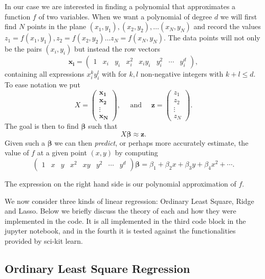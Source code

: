 \documentclass[parskip=half]{scrartcl}
\theoremstyle{definition}
\theoremstyle{remark}
\newcommand{\vect}[1]{{\bm{#1}}}
\begin{document}
In our case we are interested in finding a polynomial that approximates a function $f$ of two variables.
When we want a polynomial of degree $d$ we will first find $N$ points in the plane $(x_1, y_1), (x_2, y_2), \ldots (x_N, y_N)$ and record the values $z_1 = f(x_1, y_1), z_2 = f(x_2, y_2) \ldots z_N = f(x_N, y_N)$.
The data points will not only be the pairs $(x_i, y_i)$ but instead the row vectors 
\[
	\vect{x_i} = \begin{pmatrix} 1 & x_i & y_i & x_i^2 & x_i y_i & y_i^2 & \cdots & y_i^d \end{pmatrix},
\]
containing all expressions $x_i^k y_i^l$ with for $k,l$ non-negative integers with $k+l \leq d$. 
To ease notation we put 
\[
 X = \begin{pmatrix} \vect{x_1} \\ \vect{x_2} \\ \vdots \\ \vect{x_N} \end{pmatrix},
 \quad \text{ and } \quad
 \vect{z} = \begin{pmatrix} z_1 \\ z_2 \\ \vdots \\ z_N \end{pmatrix}. 	
\]
The goal is then to find $\vect{\beta}$ such that 
\begin{equation} \label{eq:linreg}
	X \vect{\beta} \approx \vect{z}.
\end{equation}
Given such a $\vect{\beta}$ we can then \emph{predict}, or perhaps more accurately estimate, the value of $f$ at a given point $(x,y)$ by computing 
\begin{equation} \label{eq:linregpredict}
	\begin{pmatrix} 1 & x & y & x^2 & xy & y^2 & \cdots & y^d \end{pmatrix} \vect{\beta} 
	=
	\beta_1  + \beta_2 x + \beta_3 y  + \beta_4 x^2 + \cdots.
\end{equation}
   
The expression on the right hand side is our polynomial approximation of $f$. 

We now consider three kinds of linear regression: Ordinary Least Square, Ridge and Lasso. 
Below we briefly discuss the theory of each and how they were implemented in the code.
It is all implemented in the third code block in the jupyter notebook, and in the fourth it is tested against the functionalities provided by sci-kit learn. 

\subsection{Ordinary Least Square Regression}
\end{document}
